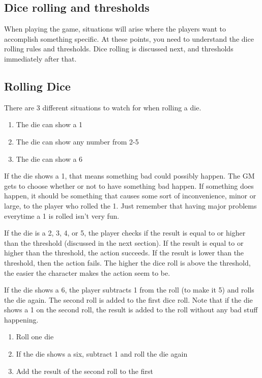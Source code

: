 \begin{flushleft}

\chapter{Dice rolling and thresholds} \label{dice_mechanics}

When playing the game, situations will arise where the players want to
accomplish something specific. At these points, you need to understand the dice
rolling rules and thresholds. Dice rolling is discussed next, and thresholds
immediately after that.

\section*{Rolling Dice} \label{dice_rolling}

There are 3 different situations to watch for when rolling a die.

\begin{enumerate}
    \item{The die can show a 1}
    \item{The die can show any number from 2-5}
    \item{The die can show a 6}
\end{enumerate}

If the die shows a 1, that means something bad could possibly happen. The GM
gets to choose whether or not to have something bad happen. If something does
happen, it should be something that causes some sort of inconvenience, minor or
large, to the player who rolled the 1. Just remember that having major problems
everytime a 1 is rolled isn't very fun.

If the die is a 2, 3, 4, or 5, the player checks if the result is equal to or
higher than the threshold (discussed in the next section). If the result is
equal to or higher than the threshold, the action succeeds. If the result is
lower than the threshold, then the action fails. The higher the dice roll is
above the threshold, the easier the character makes the action seem to be.

If the die shows a 6, the player subtracts 1 from the roll (to make it 5)
and rolls the die again. The second roll is added to the first dice roll. Note
that if the die shows a 1 on the second roll, the result is added to the roll
without any bad stuff happening.

\begin{enumerate}
    \item{Roll one die}
    \item{If the die shows a six, subtract 1 and roll the die again}
    \item{Add the result of the second roll to the first}
\end{enumerate}


\end{flushleft}
